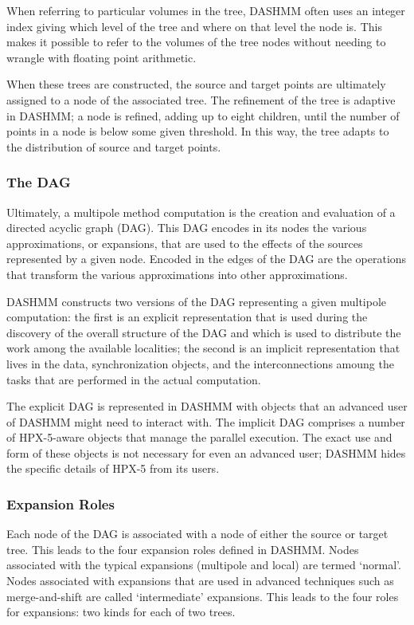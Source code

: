 When referring to particular volumes in the tree, DASHMM often uses an integer
index giving which level of the tree and where on that level the node is. This
makes it possible to refer to the volumes of the tree nodes without needing to
wrangle with floating point arithmetic.

When these trees are constructed, the source and target points are ultimately
assigned to a node of the associated tree. The refinement of the tree is
adaptive in DASHMM; a node is refined, adding up to eight children, until the
number of points in a node is below some given threshold. In this way, the
tree adapts to the distribution of source and target points.

\subsubsection{The DAG}

Ultimately, a multipole method computation is the creation and evaluation of
a directed acyclic graph (DAG). This DAG encodes in its nodes the various
approximations, or expansions, that are used to the effects of the sources
represented by a given node. Encoded in the edges of the DAG are the operations
that transform the various approximations into other approximations.

DASHMM constructs two versions of the DAG representing a given multipole
computation: the first is an explicit representation that is used during the
discovery of the overall structure of the DAG and which is used to distribute
the work among the available localities; the second is an implicit
representation that lives in the data, synchronization objects, and the
interconnections amoung the tasks that are performed in the actual computation.

The explicit DAG is represented in DASHMM with objects that an advanced user of
DASHMM might need to interact with. The implicit DAG comprises a number of
HPX-5-aware objects that manage the parallel execution. The exact use and form
of these objects is not necessary for even an advanced user; DASHMM hides the
specific details of HPX-5 from its users.

\subsubsection{Expansion Roles}

Each node of the DAG is associated with a node of either the source or target
tree. This leads to the four expansion roles defined in DASHMM. Nodes
associated with the typical expansions (multipole and local) are termed
`normal'. Nodes associated with expansions that are used in advanced techniques
such as merge-and-shift are called `intermediate' expansions. This leads to
the four roles for expansions: two kinds for each of two trees.

